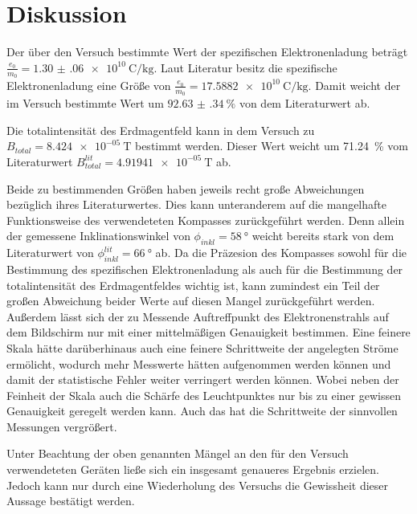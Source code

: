 \section{Diskussion}
\label{sec:Diskussion}
Der über den Versuch bestimmte Wert der spezifischen
Elektronenladung beträgt  \\
${\frac{e_0}{m_0}=\SI{1.30(06)e10}{\coulomb\per\kilo\g}}$. Laut Literatur \cite{spez_elektroncharge} besitz die spezifische Elektronenladung eine Größe von 
$\frac{e_0}{m_0}=\SI{17.5882e10}{\coulomb\per\kilo\g}$. Damit weicht der im Versuch bestimmte Wert um 
$\SI{92.63(34)}{\percent}$ von dem Literaturwert ab. 


Die totalintensität des Erdmagentfeld kann in dem Versuch zu 
$B_{total}=\SI{8.424e-05}{\tesla}$ bestimmt werden. Dieser Wert weicht um \SI{71.24}{\percent} vom Literaturwert \cite{mag_DO} ${B_{total}^{lit}=\SI{4.91941e-05}{\tesla}}$ ab.


Beide zu bestimmenden Größen haben jeweils recht große Abweichungen bezüglich ihres Literaturwertes. Dies kann unteranderem auf die mangelhafte Funktionsweise des verwendeteten Kompasses zurückgeführt werden. Denn allein der gemessene Inklinationswinkel von $\phi_{inkl}=\SI{58}{\degree}$ weicht bereits stark von dem Literaturwert \cite{mag_DO} von $\phi_{inkl}^{lit}=\SI{66}{\degree}$ ab. Da die Präzesion des Kompasses sowohl für die Bestimmung des spezifischen Elektronenladung als auch für die Bestimmung der totalintensität des Erdmagentfeldes wichtig ist, kann zumindest ein Teil der großen Abweichung beider Werte auf diesen Mangel zurückgeführt werden. Außerdem lässt sich der zu Messende Auftreffpunkt des Elektronenstrahls auf dem Bildschirm nur mit einer mittelmäßigen Genauigkeit bestimmen. Eine feinere Skala hätte darüberhinaus auch eine feinere Schrittweite der angelegten Ströme ermölicht, wodurch mehr Messwerte hätten aufgenommen werden können und damit der statistische Fehler weiter verringert werden können. Wobei neben der Feinheit der Skala auch die Schärfe des Leuchtpunktes nur bis zu einer gewissen Genauigkeit geregelt werden kann. Auch das hat die Schrittweite der sinnvollen Messungen vergrößert.


Unter Beachtung der oben genannten Mängel an den für den Versuch verwendeteten Geräten ließe sich ein insgesamt genaueres Ergebnis erzielen. Jedoch kann nur durch eine Wiederholung des Versuchs die Gewissheit dieser Aussage bestätigt werden.






